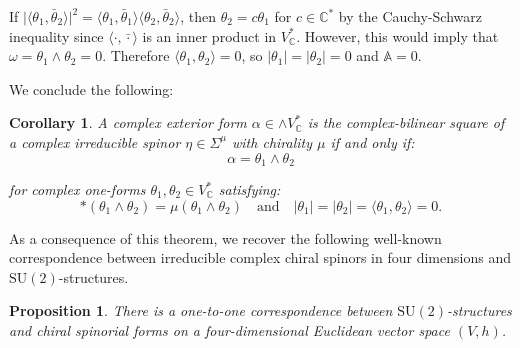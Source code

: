 \documentclass[10pt,a4paper,twoside,reqno]{amsart}
\theoremstyle{plain}
\newtheorem{prop}[thm]{Proposition}
\newtheorem{cor}[thm]{Corollary}
\theoremstyle{definition}
\theoremstyle{remark}
\def\C{\mathbb{C}}
\def\SU{\mathrm{SU}}
\newcommand{\abs}[1]{\left\lvert#1\right\rvert}
\newcommand{\escal}[1]{\langle#1\rangle}
\begin{document}
\noindent
If $\lvert\escal{\theta_1,\bar\theta_2}\rvert^2=\escal{\theta_1,\bar\theta_1}\escal{\theta_2,\bar\theta_2}$, then $\theta_2=c\theta_1$ for $c\in\C^*$ by the Cauchy-Schwarz inequality since $\escal{\cdot,\bar\cdot}$ is an inner product in $V^*_\C$. However, this would imply that $\omega=\theta_1\wedge\theta_2=0$. Therefore $\escal{\theta_1,\theta_2}=0$, so $\abs{\theta_1}=\abs{\theta_2}=0$ and $\mathbb{A}=0$.\medskip

We conclude the following:

\begin{cor}
\label{cor:Bilinear4d}
A complex exterior form $\alpha\in\wedge V^*_\C$ is the complex-bilinear square of a complex irreducible spinor $\eta\in\Sigma^\mu$ with chirality $\mu$ if and only if: 
\begin{equation*}
\alpha=\theta_1\wedge\theta_2    
\end{equation*}

\noindent
for complex one-forms $\theta_1,\theta_2 \in V^{\ast}_{\C}$ satisfying:
\begin{equation*}
*(\theta_1\wedge\theta_2)=\mu(\theta_1\wedge\theta_2)\quad\text{and}\quad\abs{\theta_1}=\abs{\theta_2}=\escal{\theta_1,\theta_2}=0.
\end{equation*}
\end{cor}

\noindent
As a consequence of this theorem, we recover the following well-known correspondence between irreducible complex chiral spinors in four dimensions and $\SU(2)$-structures.

\begin{prop}
There is a one-to-one correspondence between $\SU(2)$-structures and chiral spinorial forms on a four-dimensional Euclidean vector space $(V,h)$.
\end{prop}
\end{document}
